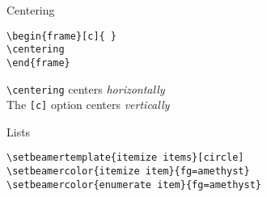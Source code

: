 \documentclass[9pt]{beamer}
\begin{document}
\begin{frame}[fragile=singleslide]{Centering}
    \begin{verbatim}
\begin{frame}[c]{ }
\centering
\end{frame}
    \end{verbatim}

\verb|\centering| centers \emph{horizontally}\\
The \verb|[c]| option centers \emph{vertically}
\end{frame}%

\begin{frame}[fragile=singleslide]{Lists}
\begin{verbatim}
\setbeamertemplate{itemize items}[circle]
\setbeamercolor{itemize item}{fg=amethyst}
\setbeamercolor{enumerate item}{fg=amethyst}
\end{verbatim}
\end{frame}%
\end{document}
